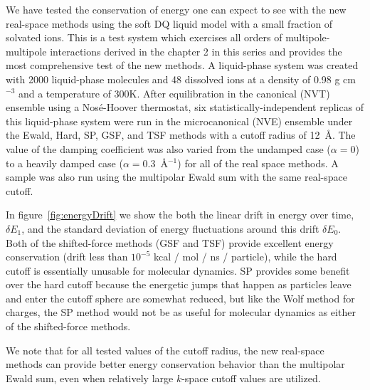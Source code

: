 We have tested the conservation of energy one can expect to see with
the new real-space methods using the soft DQ liquid model with a small
fraction of solvated ions. This is a test system which exercises all
orders of multipole-multipole interactions derived in the chapter 2
in this series and provides the most comprehensive test of the new
methods.  A liquid-phase system was created with 2000 liquid-phase
molecules and 48 dissolved ions at a density of 0.98 g cm$^{-3}$ and a
temperature of 300K.  After equilibration in the canonical (NVT)
ensemble using a Nos\'e-Hoover thermostat, six
statistically-independent replicas of this liquid-phase system were
run in the microcanonical (NVE) ensemble under the Ewald, Hard, SP,
GSF, and TSF methods with a cutoff radius of 12~\AA.  The value of the
damping coefficient was also varied from the undamped case ($\alpha =
0$) to a heavily damped case ($\alpha = 0.3$~\AA$^{-1}$) for all of
the real space methods.  A sample was also run using the multipolar
Ewald sum with the same real-space cutoff.

In figure~\ref{fig:energyDrift} we show the both the linear drift in
energy over time, $\delta E_1$, and the standard deviation of energy
fluctuations around this drift $\delta E_0$.  Both of the
shifted-force methods (GSF and TSF) provide excellent energy
conservation (drift less than $10^{-5}$ kcal / mol / ns / particle),
while the hard cutoff is essentially unusable for molecular dynamics.
SP provides some benefit over the hard cutoff because the energetic
jumps that happen as particles leave and enter the cutoff sphere are
somewhat reduced, but like the Wolf method for charges, the SP method
would not be as useful for molecular dynamics as either of the
shifted-force methods.

We note that for all tested values of the cutoff radius, the new
real-space methods can provide better energy conservation behavior
than the multipolar Ewald sum, even when relatively large $k$-space
cutoff values are utilized.

